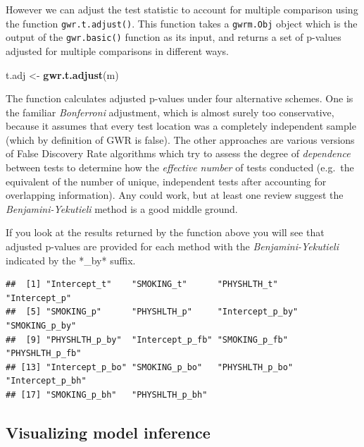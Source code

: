 \documentclass[
]{book}
\newenvironment{Shaded}{\begin{snugshade}}{\end{snugshade}}
\newcommand{\FunctionTok}[1]{\textcolor[rgb]{0.13,0.29,0.53}{\textbf{#1}}}
\newcommand{\NormalTok}[1]{#1}
\newcommand{\OtherTok}[1]{\textcolor[rgb]{0.56,0.35,0.01}{#1}}
\newcommand{\SpecialCharTok}[1]{\textcolor[rgb]{0.81,0.36,0.00}{\textbf{#1}}}
\begin{document}
However we can adjust the test statistic to account for multiple comparison using the function \texttt{gwr.t.adjust()}. This function takes a \texttt{gwrm.Obj} object which is the output of the \texttt{gwr.basic()} function as its input, and returns a set of p-values adjusted for multiple comparisons in different ways.

\begin{Shaded}
\begin{Highlighting}[]
\NormalTok{t.adj }\OtherTok{\textless{}{-}} \FunctionTok{gwr.t.adjust}\NormalTok{(m)}
\end{Highlighting}
\end{Shaded}

The function calculates adjusted p-values under four alternative schemes. One is the familiar \emph{Bonferroni} adjustment, which is almost surely too conservative, because it assumes that every test location was a completely independent sample (which by definition of GWR is false). The other approaches are various versions of False Discovery Rate algorithms which try to assess the degree of \emph{dependence} between tests to determine how the \emph{effective number} of tests conducted (e.g.~the equivalent of the number of unique, independent tests after accounting for overlapping information). Any could work, but at least one review suggest the \emph{Benjamini-Yekutieli} method is a good middle ground.

If you look at the results returned by the function above you will see that adjusted p-values are provided for each method with the \emph{Benjamini-Yekutieli} indicated by the *\_by* suffix.

\begin{Shaded}
\end{Shaded}

\begin{verbatim}
##  [1] "Intercept_t"    "SMOKING_t"      "PHYSHLTH_t"     "Intercept_p"   
##  [5] "SMOKING_p"      "PHYSHLTH_p"     "Intercept_p_by" "SMOKING_p_by"  
##  [9] "PHYSHLTH_p_by"  "Intercept_p_fb" "SMOKING_p_fb"   "PHYSHLTH_p_fb" 
## [13] "Intercept_p_bo" "SMOKING_p_bo"   "PHYSHLTH_p_bo"  "Intercept_p_bh"
## [17] "SMOKING_p_bh"   "PHYSHLTH_p_bh"
\end{verbatim}

\hypertarget{visualizing-model-inference}{%
\subsection{Visualizing model inference}\label{visualizing-model-inference}}
\end{document}
